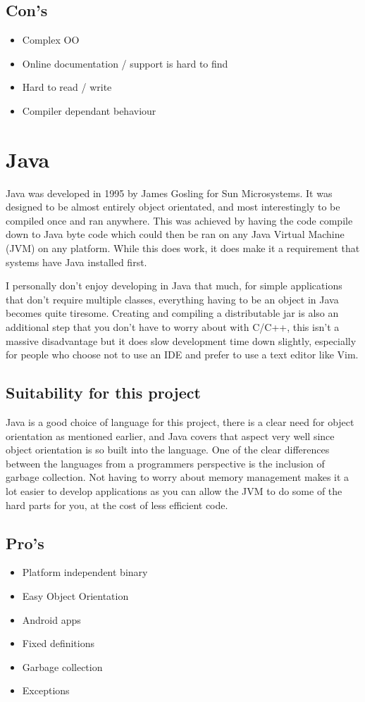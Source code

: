 \documentclass[10pt]{article}
\begin{document}
  \subsection{Con's}
  \begin{itemize}
    \item Complex OO
    \item Online documentation / support is hard to find
    \item Hard to read / write
    \item Compiler dependant behaviour
  \end{itemize}

  \section{Java}
  Java was developed in 1995 by James Gosling for Sun Microsystems. It was designed to be almost entirely object orientated, and most interestingly to be compiled once and ran anywhere. This was achieved by having the code compile down to Java byte code which could then be ran on any Java Virtual Machine (JVM) on any platform. While this does work, it does make it a requirement that systems have Java installed first. 

  I personally don't enjoy developing in Java that much, for simple applications that don't require multiple classes, everything having to be an object in Java becomes quite tiresome. Creating and compiling a distributable jar is also an additional step that you don't have to worry about with C/C++, this isn't a massive disadvantage but it does slow development time down slightly, especially for people who choose not to use an IDE and prefer to use a text editor like Vim.

  \subsection{Suitability for this project}
  Java is a good choice of language for this project, there is a clear need for object orientation as mentioned earlier, and Java covers that aspect very well since object orientation is so built into the language. One of the clear differences between the languages from a programmers perspective is the inclusion of garbage collection. Not having to worry about memory management makes it a lot easier to develop applications as you can allow the JVM to do some of the hard parts for you, at the cost of less efficient code. 


  \subsection{Pro's}
  \begin{itemize}
    \item Platform independent binary
    \item Easy Object Orientation
    \item Android apps
    \item Fixed definitions
    \item Garbage collection
    \item Exceptions
  \end{itemize}
\end{document}
